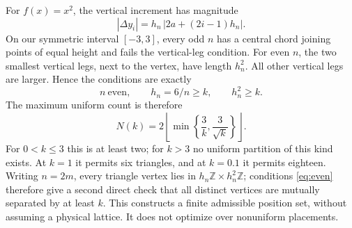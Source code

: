 \documentclass[11pt]{article}
\begin{document}
For $f(x)=x^2$, the vertical increment has magnitude
\begin{equation}\label{eq:parabola-increment}
 |\Delta y_i|=h_n\,|2a+(2i-1)h_n|.
\end{equation}
On our symmetric interval $[-3,3]$, every odd $n$ has a central chord
joining points of equal height and fails the vertical-leg condition.
For even $n$, the two smallest vertical legs, next to the vertex, have
length $h_n^2$. All other vertical legs are larger. Hence the conditions
are exactly
\begin{equation}\label{eq:even}
 n\ \text{even},\qquad h_n=6/n\ge k,\qquad h_n^2\ge k.
\end{equation}
The maximum uniform count is therefore
\begin{equation}\label{eq:nk}
 \boxed{N(k)=2\left\lfloor\min\left\{
 \frac3k,\frac3{\sqrt{k}}\right\}\right\rfloor.}
\end{equation}
For $0<k\le3$ this is at least two; for $k>3$ no uniform partition
of this kind exists. At $k=1$ it permits six triangles, and at $k=0.1$
it permits eighteen. Writing $n=2m$, every triangle vertex lies in
$h_n\mathbb Z\times h_n^2\mathbb Z$; conditions \eqref{eq:even}
therefore give a second direct check that all distinct vertices are
mutually separated by at least $k$. This constructs a finite admissible
position set, without assuming a physical lattice. It does not optimize
over nonuniform placements.
\end{document}

